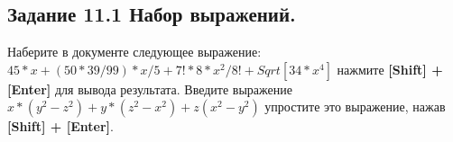 \subsection*{\textbf{Задание 11.1} Набор выражений.}
Наберите в документе следующее выражение:
$45*x+(50*39/99)*x/5+7!*8*x^2/8!+Sqrt[34*x^4]$
нажмите \textbf{[Shift] + [Enter]} для вывода результата.
Введите выражение $x*(y^2-z^2)+y*(z^2-x^2)+z(x^2-y^2)$
упростите это выражение, нажав \textbf{[Shift] + [Enter]}.

\begin{figure}[H]
    \renewcommand{\figurename}{Рисунок}
    \label{fig:image_1}
\end{figure}